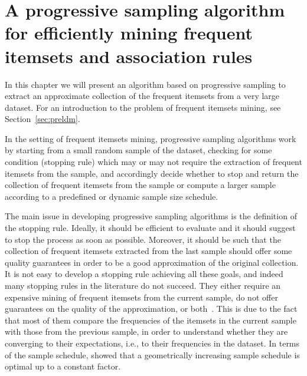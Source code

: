 \chapter{A progressive sampling algorithm for efficiently mining frequent
itemsets and association rules}\label{ch:shatterfi}

In this chapter we will present an algorithm based on progressive sampling to
extract an approximate collection of the frequent itemsets from a very large
dataset. For an introduction to the problem of frequent itemsets mining, see
Section~\ref{sec:preldm}.

In the setting of frequent itemsets mining, progressive sampling algorithms work
by starting from a small random sample of the dataset, checking for some
condition (stopping rule) which may or may not require the extraction of
frequent itemsets from the sample, and accordingly decide whether to stop and
return the collection of frequent itemsets from the sample or compute a larger
sample according to a predefined or dynamic sample size schedule.

The main issue in developing progressive sampling algorithms is the definition
of the stopping rule. Ideally, it should be efficient to evaluate and it should
suggest to stop the process as soon as possible. Moreover, it should be such
that the collection of frequent itemsets extracted from the last sample should
offer some quality guarantees in order to be a good approximation of the
original collection. 
It is not easy to develop a stopping rule achieving all these goals, and indeed
many stopping rules in the literature do not succeed. They either
require an expensive mining of frequent itemsets from the current
sample, do not offer guarantees on the quality of the approximation, or
both~\citep{BronnimanCDHS03,ChandraB11,ChenHH11,ChenHS02,ChuangCY05,HuY06,HwangK06,JiaG05,MahafzahABAZ09,Parthasarathy02,PietracaprinaRUV10,SchefferW02,WangDC05}.
This is due to the fact that most of them compare the frequencies of the
itemsets in the current sample with those from the previous sample, in order to
understand whether they are converging to their expectations, i.e., to their
frequencies in the dataset. In terms of the sample schedule, \citet{JohnL96}
showed that a geometrically increasing sample schedule is optimal up to a
constant factor.

